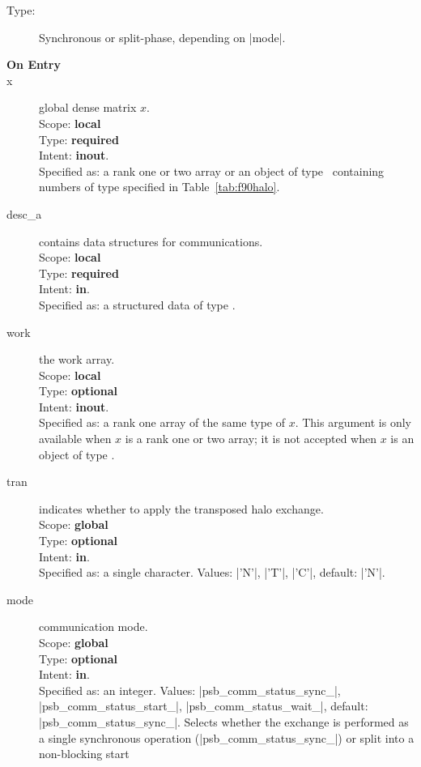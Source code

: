 \begin{description}
\item[Type:] Synchronous or split-phase, depending on \fortinline|mode|.
\item[\bf On Entry]
\item[x] global dense matrix $x$.\\
Scope: {\bf local} \\
Type: {\bf required} \\
Intent: {\bf inout}.\\
Specified as:  a rank one or two array or an object of type \vdata\
containing numbers of type specified in
Table~\ref{tab:f90halo}.
\item[desc\_a] contains data structures for communications.\\
Scope: {\bf local} \\
Type: {\bf required}\\
Intent: {\bf in}.\\
Specified as: a structured data of type \descdata.
\item[work] the work array. \\
Scope: {\bf local} \\
Type: {\bf optional}\\
Intent: {\bf inout}.\\
Specified as: a rank one array of the same type of $x$. This argument
is only available when $x$ is a rank one or two array; it is not
accepted when $x$ is an object of type \vdata.
\item[tran] indicates whether to apply the transposed halo exchange.\\
Scope: {\bf global} \\
Type: {\bf optional} \\
Intent: {\bf in}.\\
Specified as: a single character. Values: \fortinline|'N'|, \fortinline|'T'|,
\fortinline|'C'|, default: \fortinline|'N'|.
\item[mode] communication mode.\\
Scope: {\bf global} \\
Type: {\bf optional} \\
Intent: {\bf in}.\\
Specified as: an integer. Values: \fortinline|psb_comm_status_sync_|,
\fortinline|psb_comm_status_start_|, \fortinline|psb_comm_status_wait_|, default:
\fortinline|psb_comm_status_sync_|. Selects whether the exchange is
performed as a single synchronous operation
(\fortinline|psb_comm_status_sync_|) or split into a non-blocking start

\end{description}
